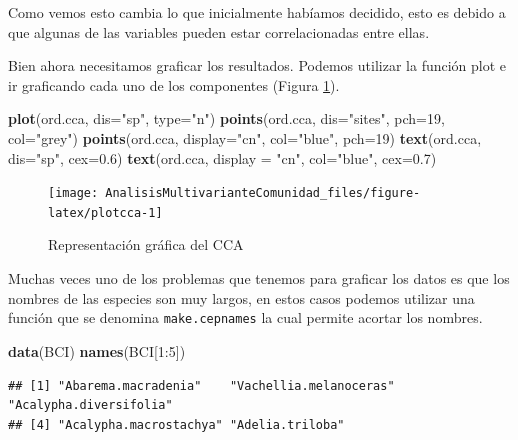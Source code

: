 \documentclass[]{book}
\newenvironment{Shaded}{\begin{snugshade}}{\end{snugshade}}
\newcommand{\KeywordTok}[1]{\textcolor[rgb]{0.13,0.29,0.53}{\textbf{{#1}}}}
\newcommand{\DataTypeTok}[1]{\textcolor[rgb]{0.13,0.29,0.53}{{#1}}}
\newcommand{\DecValTok}[1]{\textcolor[rgb]{0.00,0.00,0.81}{{#1}}}
\newcommand{\FloatTok}[1]{\textcolor[rgb]{0.00,0.00,0.81}{{#1}}}
\newcommand{\StringTok}[1]{\textcolor[rgb]{0.31,0.60,0.02}{{#1}}}
\newcommand{\NormalTok}[1]{{#1}}
\begin{document}
Como vemos esto cambia lo que inicialmente habíamos decidido, esto es
debido a que algunas de las variables pueden estar correlacionadas entre
ellas.

Bien ahora necesitamos graficar los resultados. Podemos utilizar la
función plot e ir graficando cada uno de los componentes (Figura
\ref{fig:plotcca}).

\begin{Shaded}
\begin{Highlighting}[]
\KeywordTok{plot}\NormalTok{(ord.cca, }\DataTypeTok{dis=}\StringTok{"sp"}\NormalTok{, }\DataTypeTok{type=}\StringTok{"n"}\NormalTok{)}
\KeywordTok{points}\NormalTok{(ord.cca, }\DataTypeTok{dis=}\StringTok{"sites"}\NormalTok{, }\DataTypeTok{pch=}\DecValTok{19}\NormalTok{, }\DataTypeTok{col=}\StringTok{"grey"}\NormalTok{)}
\KeywordTok{points}\NormalTok{(ord.cca, }\DataTypeTok{display=}\StringTok{"cn"}\NormalTok{, }\DataTypeTok{col=}\StringTok{"blue"}\NormalTok{, }\DataTypeTok{pch=}\DecValTok{19}\NormalTok{)}
\KeywordTok{text}\NormalTok{(ord.cca, }\DataTypeTok{dis=}\StringTok{"sp"}\NormalTok{, }\DataTypeTok{cex=}\FloatTok{0.6}\NormalTok{)}
\KeywordTok{text}\NormalTok{(ord.cca, }\DataTypeTok{display =} \StringTok{"cn"}\NormalTok{, }\DataTypeTok{col=}\StringTok{"blue"}\NormalTok{, }\DataTypeTok{cex=}\FloatTok{0.7}\NormalTok{)}
\end{Highlighting}
\end{Shaded}

\begin{figure}

{\centering \texttt{[image: AnalisisMultivarianteComunidad\_files/figure-latex/plotcca-1]} 

}

\caption{Representación gráfica del CCA}\label{fig:plotcca}
\end{figure}

Muchas veces uno de los problemas que tenemos para graficar los datos es
que los nombres de las especies son muy largos, en estos casos podemos
utilizar una función que se denomina \texttt{make.cepnames} la cual
permite acortar los nombres.

\begin{Shaded}
\begin{Highlighting}[]
\KeywordTok{data}\NormalTok{(BCI)}
\KeywordTok{names}\NormalTok{(BCI[}\DecValTok{1}\NormalTok{:}\DecValTok{5}\NormalTok{])}
\end{Highlighting}
\end{Shaded}

\begin{verbatim}
## [1] "Abarema.macradenia"    "Vachellia.melanoceras" "Acalypha.diversifolia"
## [4] "Acalypha.macrostachya" "Adelia.triloba"
\end{verbatim}
\end{document}

